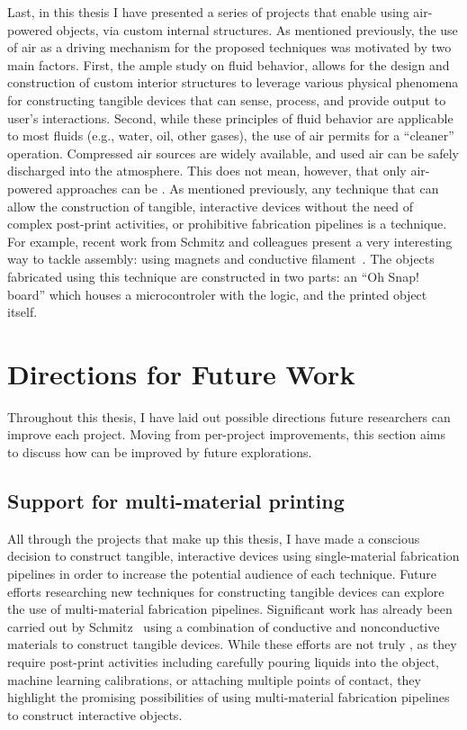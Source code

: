     Last, in this thesis I have presented a series of projects that enable \papf
    using air-powered objects, via custom internal structures. As mentioned
    previously, the use of air as a driving mechanism for the proposed
    techniques was motivated by two main factors. First, the ample study on
    fluid behavior, allows for the design and construction of custom interior
    structures to leverage various physical phenomena for constructing tangible
    devices that can sense, process, and provide output to user's interactions.
    Second, while these principles of fluid behavior are applicable to most
    fluids (e.g., water, oil, other gases), the use of air permits for a
    ``cleaner'' operation. Compressed air sources are widely available, and used
    air can be safely discharged into the atmosphere. This does not mean,
    however, that only air-powered approaches can be \pap.  As mentioned
    previously, any technique that can allow the construction of tangible,
    interactive devices without the need of complex post-print activities, or
    prohibitive fabrication pipelines is a \papf technique. For example, recent
    work from Schmitz and colleagues present a very interesting way to tackle
    assembly: using magnets and conductive filament~\cite{Schmitz:2021}. The
    objects fabricated using this technique are constructed in two parts: an
    ``Oh Snap!  board'' which houses a microcontroler with the logic, and the
    printed object itself.

  \section{Directions for Future Work}
    Throughout this thesis, I have laid out possible directions future
    researchers can improve each project. Moving from per-project improvements,
    this section aims to discuss how \papf can be improved by future
    explorations.

    \subsection{Support for multi-material printing}
      All through the projects that make up this thesis, I have made a conscious
      decision to construct tangible, interactive devices using single-material
      fabrication pipelines in order to increase the potential audience of each
      technique. Future efforts researching new \pap techniques for constructing
      tangible devices can explore the use of multi-material fabrication
      pipelines. Significant work has already been carried out by
      Schmitz~\cite{Schmitz:2019a} using a combination of conductive and
      nonconductive materials to construct tangible devices. While these efforts
      are not truly \pap, as they require post-print activities including
      carefully pouring liquids into the object, machine learning
      calibrations, or attaching multiple points of contact, they highlight the
      promising possibilities of using multi-material fabrication pipelines to
      construct interactive objects.

